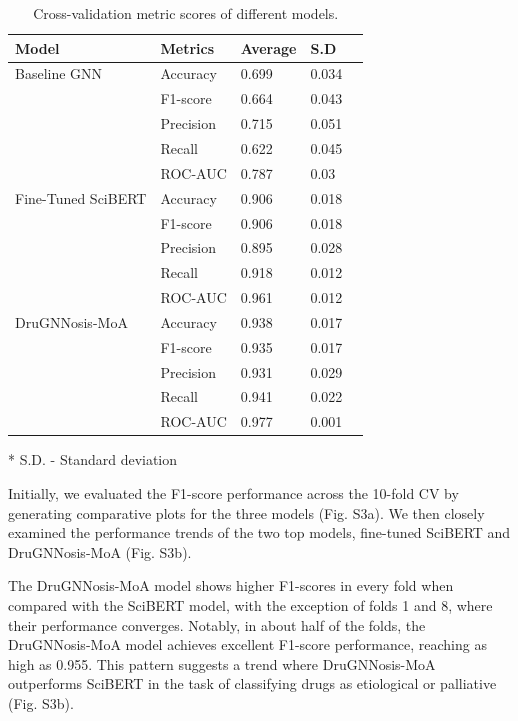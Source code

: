 \documentclass[journal,twoside,web]{ieeecolor}
\begin{document}
\begin{table}
\caption{Cross-validation metric scores of different models.
\label{tbl:cv_scores}}%
\begin{tabular*}{\columnwidth}{@{\extracolsep\fill}lllll@{\extracolsep\fill}}
\toprule
Model & Metrics & Average & S.D \\
\midrule
Baseline GNN & Accuracy    & 0.699   & 0.034 \\
             & F1-score         & 0.664   & 0.043 \\
             & Precision         & 0.715   & 0.051 \\
             & Recall            & 0.622    & 0.045 \\
             & ROC-AUC     & 0.787   & 0.03 \\
\midrule
Fine-Tuned SciBERT & Accuracy    & 0.906   & 0.018 \\
                   & F1-score         & 0.906   & 0.018 \\
                   & Precision         & 0.895   & 0.028 \\
                   & Recall            & 0.918   & 0.012 \\
                   & ROC-AUC     & 0.961   & 0.012 \\
\midrule
DruGNNosis-MoA & Accuracy    & 0.938    & 0.017 \\
            & F1-score         & 0.935   & 0.017 \\
            & Precision         & 0.931   & 0.029 \\
            & Recall            & 0.941   & 0.022 \\
            & ROC-AUC     & 0.977   & 0.001 \\
\bottomrule
\end{tabular*}
\begin{tablenotes}%
\item[*] S.D. - Standard deviation
\end{tablenotes}
\end{table}


Initially, we evaluated the F1-score performance across the 10-fold CV by generating comparative plots for the three models (Fig. S3a).%
We then closely examined the performance trends of the two top models, fine-tuned SciBERT and DruGNNosis-MoA (Fig. S3b).%

The DruGNNosis-MoA model shows higher F1-scores in every fold when compared with the SciBERT model, with the exception of folds 1 and 8, where their performance converges.
Notably, in about half of the folds, the DruGNNosis-MoA model achieves excellent F1-score performance, reaching as high as 0.955.
This pattern suggests a trend where DruGNNosis-MoA outperforms SciBERT in the task of classifying drugs as etiological or palliative (Fig. S3b). %
\end{document}
